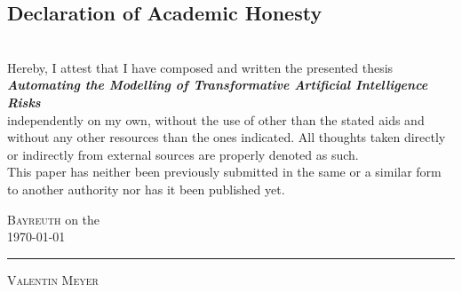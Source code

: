 \documentclass[
  11pt,
  letterpaper,
]{book}
\begin{document}
    \subsection*{\Large Declaration of Academic Honesty}
	    \vspace{1cm}\noindent \\
	    Hereby, I attest that I have composed and written the presented thesis 
        \vspace*{0.5cm}\noindent \\
        \textit{ \textbf{ Automating the Modelling of Transformative Artificial Intelligence Risks }}
        \vspace*{0.5cm}\noindent \\
        independently on my own, without the use of other than the stated aids and without any other resources than the ones indicated. All thoughts taken directly or indirectly from external sources are properly denoted as such.
	    \vspace{\baselineskip}
	    \\  This paper has neither been previously submitted in the same or a similar form to another authority nor has it been published yet.
	    \vspace{2cm}
	    
    \flushright
    \begin{minipage}{0.5\textwidth}
        \begin{flushleft} \large
        \textsc{Bayreuth}                     %
        on the \\ %
        \today           %
        \vspace{2cm}\\
    	{\rule[-3pt]{\linewidth}{.4pt}\par\smallskip  
        \textsc{Valentin Meyer}	\\         %
    	}
        \end{flushleft}
        \end{minipage}
\end{document}
